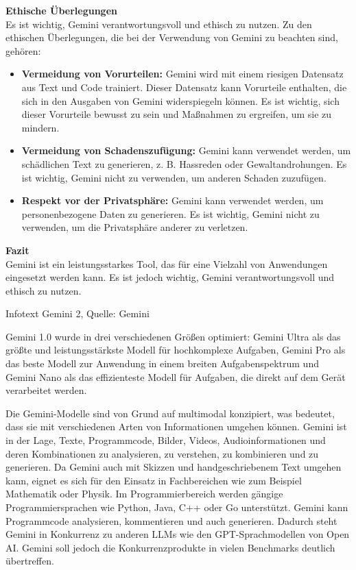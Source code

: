 \begin{prompt} 
    \begin{tcolorbox}[colback=gray!20, colframe=gray!20, boxrule=0pt, sharp corners] 
        \textbf{Ethische Überlegungen}\\
        Es ist wichtig, Gemini verantwortungsvoll und ethisch zu nutzen. Zu den ethischen Überlegungen, die bei der Verwendung von Gemini zu beachten sind, gehören:
        \begin{itemize}
            \item \textbf{Vermeidung von Vorurteilen:} Gemini wird mit einem riesigen Datensatz aus Text und Code trainiert. Dieser Datensatz 
            kann Vorurteile enthalten, die sich in den Ausgaben von Gemini widerspiegeln können. Es ist wichtig, sich dieser Vorurteile bewusst 
            zu sein und Maßnahmen zu ergreifen, um sie zu mindern.
            \item \textbf{Vermeidung von Schadenszufügung:} Gemini kann verwendet werden, um schädlichen Text zu generieren, z. B. Hassreden 
            oder Gewaltandrohungen. Es ist wichtig, Gemini nicht zu verwenden, um anderen Schaden zuzufügen.
            \item \textbf{Respekt vor der Privatsphäre:} Gemini kann verwendet werden, um personenbezogene Daten zu generieren. Es ist wichtig, 
            Gemini nicht zu verwenden, um die Privatsphäre anderer zu verletzen.
        \end{itemize}
        \textbf{Fazit}\\
        Gemini ist ein leistungsstarkes Tool, das für eine Vielzahl von Anwendungen eingesetzt werden kann. Es ist jedoch wichtig, Gemini verantwortungsvoll und ethisch zu nutzen.
    \vfill
    \end{tcolorbox}
    \caption{Infotext Gemini 2, Quelle: Gemini}
    \label{InfotextGemini2}
\end{prompt}

Gemini 1.0 wurde in drei verschiedenen Größen optimiert: Gemini Ultra als das größte und leistungsstärkste Modell 
für hochkomplexe Aufgaben, Gemini Pro als das beste Modell zur Anwendung in einem breiten Aufgabenspektrum und Gemini 
Nano als das effizienteste Modell für Aufgaben, die direkt auf dem Gerät verarbeitet werden.

Die Gemini-Modelle sind von Grund auf multimodal konzipiert, was bedeutet, dass sie mit verschiedenen Arten von 
Informationen umgehen können. Gemini ist in der Lage, Texte, Programmcode, Bilder, Videos, Audioinformationen und 
deren Kombinationen zu analysieren, zu verstehen, zu kombinieren und zu generieren. Da Gemini auch mit Skizzen und 
handgeschriebenem Text umgehen kann, eignet es sich für den Einsatz in Fachbereichen wie zum Beispiel Mathematik oder Physik. 
Im Programmierbereich werden gängige Programmiersprachen wie Python, Java, C++ oder Go unterstützt. Gemini 
kann Programmcode analysieren, kommentieren und auch generieren. Dadurch steht Gemini in Konkurrenz zu anderen LLMs 
wie den GPT-Sprachmodellen von Open AI. Gemini soll jedoch die Konkurrenzprodukte in vielen Benchmarks deutlich übertreffen.

